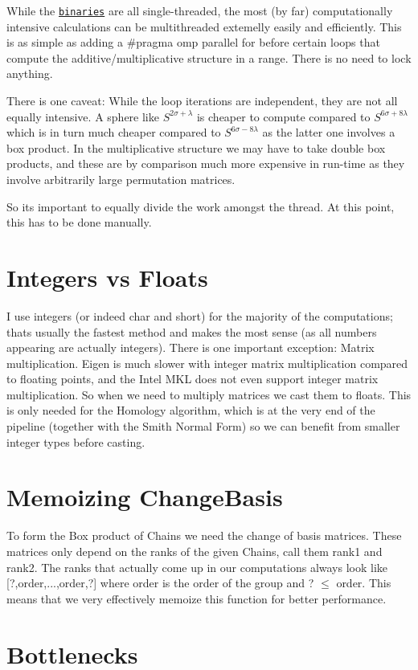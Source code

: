 \begin{DoxyItemize}
\item While the \href{https://github.com/NickG-Math/Mackey/Exec}{\tt binaries} are all single-\/threaded, the most (by far) computationally intensive calculations can be multithreaded extemelly easily and efficiently. This is as simple as adding a {\ttfamily \#pragma omp parallel for} before certain loops that compute the additive/multiplicative structure in a range. There is no need to lock anything.
\item There is one caveat\+: While the loop iterations are independent, they are not all equally intensive. A sphere like $S^{2\sigma+\lambda}$ is cheaper to compute compared to $S^{6\sigma+8\lambda}$ which is in turn much cheaper compared to $S^{6\sigma-8\lambda}$ as the latter one involves a box product. In the multiplicative structure we may have to take double box products, and these are by comparison much more expensive in run-\/time as they involve arbitrarily large permutation matrices.
\item So it\textquotesingle{}s important to equally divide the work amongst the thread. At this point, this has to be done manually.
\end{DoxyItemize}\hypertarget{perf_intvsfloat}{}\section{Integers vs Floats}\label{perf_intvsfloat}
I use integers (or indeed {\ttfamily char} and {\ttfamily short}) for the majority of the computations; that\textquotesingle{}s usually the fastest method and makes the most sense (as all numbers appearing are actually integers). There is one important exception\+: Matrix multiplication. Eigen is much slower with integer matrix multiplication compared to floating points, and the Intel M\+KL does not even support integer matrix multiplication. So when we need to multiply matrices we cast them to floats. This is only needed for the Homology algorithm, which is at the very end of the pipeline (together with the Smith Normal Form) so we can benefit from smaller integer types before casting.\hypertarget{perf_memo}{}\section{Memoizing Change\+Basis}\label{perf_memo}
To form the Box product of Chains we need the change of basis matrices. These matrices only depend on the ranks of the given Chains, call them rank1 and rank2. The ranks that actually come up in our computations always look like \mbox{[}?,order,...,order,?\mbox{]} where order is the order of the group and ? $\le$ order. This means that we very effectively memoize this function for better performance.\hypertarget{perf_bottle}{}\section{Bottlenecks}\label{perf_bottle}

